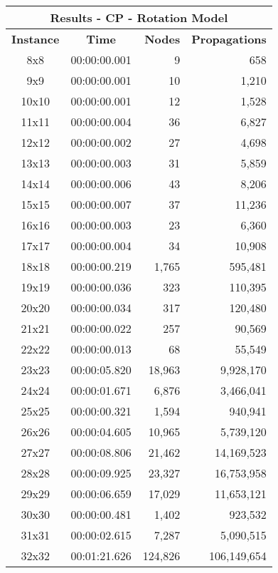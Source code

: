 
\begin{center}
    \begin{tabular}{|c|c|r|r|}
        \hline
        \multicolumn{4}{|c|}{\textbf{Results - CP - Rotation Model}} \\
        \hline
        \textbf{Instance} & \textbf{Time} & \textbf{Nodes} & \textbf{Propagations} \\
        
        \hline
		8x8 & 00:00:00.001 & 9 & 658 \\ \hline
		9x9 & 00:00:00.001 & 10 & 1,210 \\ \hline
		10x10 & 00:00:00.001 & 12 & 1,528 \\ \hline
		11x11 & 00:00:00.004 & 36 & 6,827 \\ \hline
		12x12 & 00:00:00.002 & 27 & 4,698 \\ \hline
		13x13 & 00:00:00.003 & 31 & 5,859 \\ \hline
		14x14 & 00:00:00.006 & 43 & 8,206 \\ \hline
		15x15 & 00:00:00.007 & 37 & 11,236 \\ \hline
		16x16 & 00:00:00.003 & 23 & 6,360 \\ \hline
		17x17 & 00:00:00.004 & 34 & 10,908 \\ \hline
		18x18 & 00:00:00.219 & 1,765 & 595,481 \\ \hline
		19x19 & 00:00:00.036 & 323 & 110,395 \\ \hline
		20x20 & 00:00:00.034 & 317 & 120,480 \\ \hline
		21x21 & 00:00:00.022 & 257 & 90,569 \\ \hline
		22x22 & 00:00:00.013 & 68 & 55,549 \\ \hline
		23x23 & 00:00:05.820 & 18,963 & 9,928,170 \\ \hline
		24x24 & 00:00:01.671 & 6,876 & 3,466,041 \\ \hline
		25x25 & 00:00:00.321 & 1,594 & 940,941 \\ \hline
		26x26 & 00:00:04.605 & 10,965 & 5,739,120 \\ \hline
		27x27 & 00:00:08.806 & 21,462 & 14,169,523 \\ \hline
		28x28 & 00:00:09.925 & 23,327 & 16,753,958 \\ \hline
		29x29 & 00:00:06.659 & 17,029 & 11,653,121 \\ \hline
		30x30 & 00:00:00.481 & 1,402 & 923,532 \\ \hline
		31x31 & 00:00:02.615 & 7,287 & 5,090,515 \\ \hline
		32x32 & 00:01:21.626 & 124,826 & 106,149,654 \\ \hline

\end{tabular}
\end{center}
